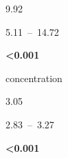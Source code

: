 \documentclass[
  letterpaper,
  DIV=11,
  numbers=noendperiod]{scrartcl}
\begin{document}
\begin{table}
\begin{minipage}[t]{\linewidth}
{\centering 

9.92

}

\end{minipage}%
\newline
\begin{minipage}[t]{\linewidth}

{\centering 

5.11~--~14.72

}

\end{minipage}%
\newline
\begin{minipage}[t]{\linewidth}

{\centering 

\textbf{\textless0.001}

}

\end{minipage}%
\newline
\begin{minipage}[t]{\linewidth}

{\centering 

concentration

}

\end{minipage}%
\newline
\begin{minipage}[t]{\linewidth}

{\centering 

3.05

}

\end{minipage}%
\newline
\begin{minipage}[t]{\linewidth}

{\centering 

2.83~--~3.27

}

\end{minipage}%
\newline
\begin{minipage}[t]{\linewidth}

{\centering 

\textbf{\textless0.001}

}

\end{minipage}%
\newline
\begin{minipage}[t]{\linewidth}

{\centering 

}
\end{minipage}
\end{table}
\end{document}
